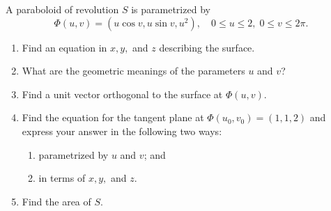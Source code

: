 \documentclass[openany]{book}
\begin{document}
\begin{prob}[16]
    A paraboloid of revolution \( S \) is parametrized by 
    \[
    \Phi(u, v) = (u \cos v, u \sin v, u^2), \quad 0 \leq u \leq 2, \; 0 \leq v \leq 2\pi.
    \]
    
    \begin{enumerate}
        \item[(a)] Find an equation in \( x, y, \) and \( z \) describing the surface.
        \item[(b)] What are the geometric meanings of the parameters \( u \) and \( v \)?
        \item[(c)] Find a unit vector orthogonal to the surface at \( \Phi(u, v) \).
        \item[(d)] Find the equation for the tangent plane at \( \Phi(u_0, v_0) = (1, 1, 2) \) and express your answer in the following two ways:
        
        \begin{enumerate}
            \item[(i)] parametrized by \( u \) and \( v \); and
            \item[(ii)] in terms of \( x, y, \) and \( z \).
        \end{enumerate}
        
        \item[(e)] Find the area of \( S \).
    \end{enumerate}
\end{prob}
\end{document}
